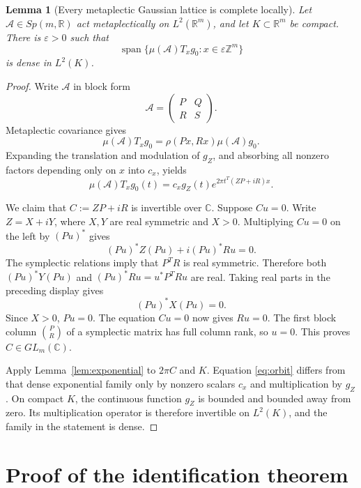 \documentclass[11pt]{article}
\newtheorem{lemma}[theorem]{Lemma}
\newcommand{\R}{\mathbb R}
\newcommand{\C}{\mathbb C}
\newcommand{\Z}{\mathbb Z}
\newcommand{\spn}{\operatorname{span}}
\begin{document}
\begin{lemma}[Every metaplectic Gaussian lattice is complete locally]
\label{lem:gaussian}
Let \(\mathcal A\in Sp(m,\R)\) act metaplectically on
\(L^2(\R^m)\), and let \(K\subset\R^m\) be compact.  There is
\(\varepsilon>0\) such that
\[
 \spn\{\mu(\mathcal A)T_xg_0:x\in\varepsilon\Z^m\}
\]
is dense in \(L^2(K)\).
\end{lemma}

\begin{proof}
Write \(\mathcal A\) in block form
\[
 \mathcal A=\begin{pmatrix}P&Q\\R&S\end{pmatrix}.
\]
Metaplectic covariance gives
\[
 \mu(\mathcal A)T_xg_0
 =\rho(Px,Rx)\mu(\mathcal A)g_0.
\]
Expanding the translation and modulation of \(g_Z\), and absorbing all
nonzero factors depending only on \(x\) into \(c_x\), yields
\begin{equation}\label{eq:orbit}
 \mu(\mathcal A)T_xg_0(t)
 =c_x g_Z(t)e^{2\pi t^T(ZP+iR)x}.
\end{equation}

We claim that \(C:=ZP+iR\) is invertible over \(\C\).  Suppose
\(Cu=0\).  Write \(Z=X+iY\), where \(X,Y\) are real symmetric and
\(X>0\).  Multiplying \(Cu=0\) on the left by \((Pu)^*\) gives
\[
 (Pu)^*Z(Pu)+i(Pu)^*Ru=0.
\]
The symplectic relations imply that \(P^TR\) is real symmetric.  Therefore
both \((Pu)^*Y(Pu)\) and \((Pu)^*Ru=u^*P^TRu\) are real.  Taking real
parts in the preceding display gives
\[
 (Pu)^*X(Pu)=0.
\]
Since \(X>0\), \(Pu=0\).  The equation \(Cu=0\) now gives \(Ru=0\).
The first block column \(\binom PR\) of a symplectic matrix has full column
rank, so \(u=0\).  This proves \(C\in GL_m(\C)\).

Apply Lemma~\ref{lem:exponential} to \(2\pi C\) and \(K\).  Equation
\eqref{eq:orbit} differs from that dense exponential family only by nonzero
scalars \(c_x\) and multiplication by \(g_Z\).  On compact \(K\), the
continuous function \(g_Z\) is bounded and bounded away from zero.  Its
multiplication operator is therefore invertible on \(L^2(K)\), and the
family in the statement is dense.
\end{proof}

\section{Proof of the identification theorem}
\end{document}
